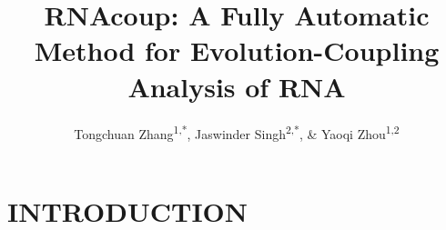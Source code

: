 \documentclass[man, donotrepeattitle]{apa6}
\title{\textbf{RNAcoup: A Fully Automatic Method for Evolution-Coupling Analysis of RNA}}
\author{Tongchuan Zhang\textsuperscript{1,*}, Jaswinder Singh\textsuperscript{2,*}, \& Yaoqi Zhou\textsuperscript{1,2}}
\date{}
\begin{document}
\maketitle

\hypertarget{introduction}{%
\section{INTRODUCTION}\label{introduction}}
\end{document}
